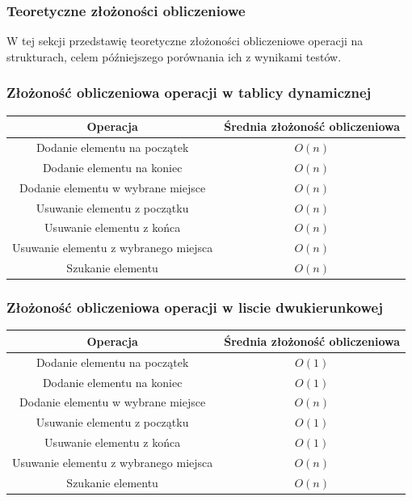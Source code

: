\documentclass{article}
\begin{document}
        \subsubsection{Teoretyczne złożoności obliczeniowe}
        W tej sekcji przedstawię teoretyczne złożoności obliczeniowe operacji na strukturach, celem późniejszego porównania ich z wynikami testów.
        \subsubsection{Złożoność obliczeniowa operacji w tablicy dynamicznej}
        \begin{center}    
            \begin{tabular}[H]{| c | c |}
                \hline
                Operacja & Średnia złożoność obliczeniowa \\ \hline \hline
                Dodanie elementu na początek & $O(n)$ \\ \hline
                Dodanie elementu na koniec & $O(n)$ \\ \hline
                Dodanie elementu w wybrane miejsce & $O(n)$ \\ \hline
                Usuwanie elementu z początku & $O(n)$ \\ \hline
                Usuwanie elementu z końca & $O(n)$ \\ \hline
                Usuwanie elementu z wybranego miejsca & $O(n)$ \\ \hline
                Szukanie elementu & $O(n)$ \\ \hline
            \end{tabular}
        \end{center}

        \subsubsection{Złożoność obliczeniowa operacji w liscie dwukierunkowej}
        \begin{center}    
            \begin{tabular}[H]{| c | c |}
                \hline
                Operacja & Średnia złożoność obliczeniowa \\ \hline \hline
                Dodanie elementu na początek & $O(1)$ \\ \hline
                Dodanie elementu na koniec & $O(1)$ \\ \hline
                Dodanie elementu w wybrane miejsce & $O(n)$ \\ \hline
                Usuwanie elementu z początku & $O(1)$ \\ \hline
                Usuwanie elementu z końca & $O(1)$ \\ \hline
                Usuwanie elementu z wybranego miejsca & $O(n)$ \\ \hline
                Szukanie elementu & $O(n)$ \\ \hline
            \end{tabular}
        \end{center}
\end{document}
